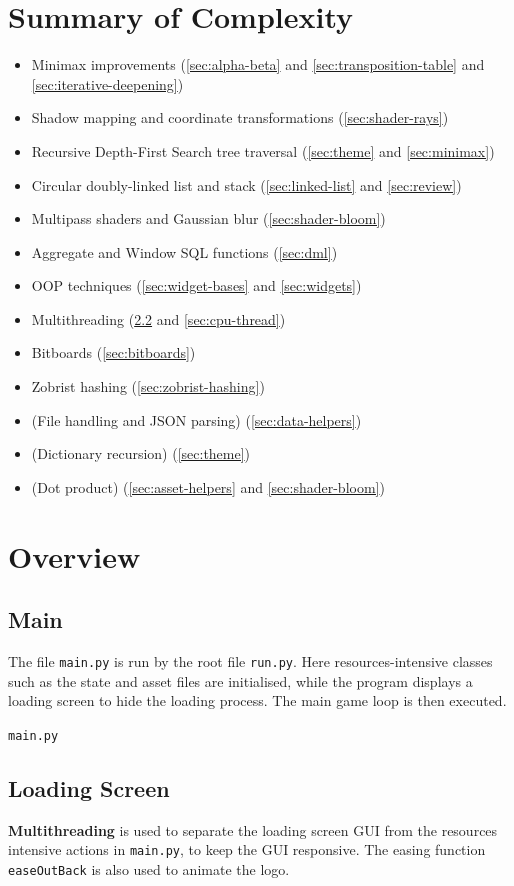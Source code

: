 \documentclass[../main/main.tex]{subfiles}
\begin{document}
\section{Summary of Complexity}
\begin{itemize}
\item Minimax improvements (\ref{sec:alpha-beta} and \ref{sec:transposition-table} and \ref{sec:iterative-deepening})
\item Shadow mapping and coordinate transformations (\ref{sec:shader-rays})
\item Recursive Depth-First Search tree traversal (\ref{sec:theme} and \ref{sec:minimax})
\item Circular doubly-linked list and stack (\ref{sec:linked-list} and \ref{sec:review})
\item Multipass shaders and Gaussian blur (\ref{sec:shader-bloom})
\item Aggregate and Window SQL functions (\ref{sec:dml})
\item OOP techniques (\ref{sec:widget-bases} and \ref{sec:widgets})
\item Multithreading (\ref{sec:loading-screen} and \ref{sec:cpu-thread})
\item Bitboards (\ref{sec:bitboards})
\item Zobrist hashing (\ref{sec:zobrist-hashing})
\item (File handling and JSON parsing) (\ref{sec:data-helpers})
\item (Dictionary recursion) (\ref{sec:theme})
\item (Dot product) (\ref{sec:asset-helpers} and \ref{sec:shader-bloom})
\end{itemize}

\section{Overview}
\subsection{Main}
The file \lstinline{main.py} is run by the root file \lstinline{run.py}. Here resources-intensive classes such as the state and asset files are initialised, while the program displays a loading screen to hide the loading process. The main game loop is then executed.

\noindent\verb|main.py|


\subsection{Loading Screen}
\label{sec:loading-screen}
\textbf{Multithreading} is used to separate the loading screen GUI from the resources intensive actions in \lstinline{main.py}, to keep the GUI responsive. The easing function \lstinline{easeOutBack} is also used to animate the logo.
\end{document}
